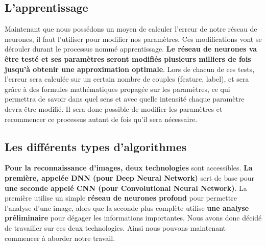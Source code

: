 \documentclass[12pt,a4paper]{extarticle}
\begin{document}
\subsection{L'apprentissage}

Maintenant que nous possédons un moyen de calculer l'erreur de notre réseau de neurones, il faut l'utiliser pour modifier nos paramètres. Ces modifications vont se dérouler durant le processus nommé apprentissage. \textbf{Le réseau de neurones va être testé et ses paramètres seront modifiés plusieurs milliers de fois jusqu'à obtenir une approximation optimale}. Lors de chacun de ces tests, l'erreur sera calculée sur un certain nombre de couples (feature, label), et sera grâce à des formules mathématiques propagée sur les paramètres, ce qui permettra de savoir dans quel sens et avec quelle intensité chaque paramètre devra être modifié. Il sera donc possible de modifier les paramètres et recommencer ce processus autant de fois qu'il sera nécessaire.

\subsection{Les différents types d'algorithmes}

\textbf{Pour la reconnaissance d'images, deux technologies} sont accessibles. \textbf{La première, appelée DNN (pour Deep Neural Network)} sert de base pour \textbf{une seconde appelé CNN (pour Convolutional Neural Network)}. La première utilise un simple \textbf{réseau de neurones profond} pour permettre l'analyse d'une image, alors que la seconde plus complète utilise \textbf{une analyse préliminaire} pour dégager les informations importantes. Nous avons donc décidé de travailler sur ces deux technologies. Ainsi nous pouvons maintenant commencer à aborder notre travail.
\end{document}
